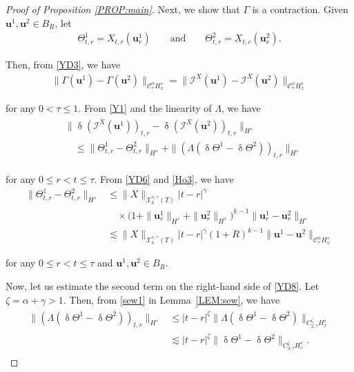 \documentclass[letterpaper, 11pt,  reqno]{amsart}
\newcommand{\1}{\hspace{0.5mm}\text{I}\hspace{0.5mm}}
\newcommand{\I}{\mathcal{I}}
\newcommand{\noi}{\noindent}
\newcommand{\CC}{\mathcal{C}}
\newcommand{\al}{\alpha}
\newcommand{\updl}{\updelta}
\newcommand{\g}{\gamma}
\newcommand{\G}{\Gamma}
\newcommand{\Ld}{\Lambda}
\newcommand{\les}{\lesssim}
\newcommand{\cX}{\mathcal{X}}
\newcommand{\uu}{\mathbf{u}}
\newcommand{\z}{\zeta}
\newcommand{\Ta}{\Theta}
\numberwithin{equation}{section}
\numberwithin{theorem}{section}
\begin{document}
\begin{proof}[Proof of Proposition \ref{PROP:main}]
Next, we show that $\G$ is a contraction. 
Given $\uu^1, \uu^2 \in B_R$, let 
\begin{align}
\Theta_{t,r}^1 = X_{t,r}(\uu^1_r)
\qquad \text{and}\qquad 
\Ta_{t,r}^2 = X_{t,r}(\uu^2_r).
\label{YD6}
\end{align}

\noi
Then, 
from \eqref{YD3}, we have 
\begin{align}
\|\G(\uu^1)- \G(\uu^2)\|_{\CC^\al_{\tau }H^s_x}
=
\|\I^X(\uu^1)- \I^X(\uu^2)\|_{\CC^\al_{\tau}H^s_x}
\label{YD7}
\end{align}


\noi
for any $0 < \tau \le 1$.
From \eqref{Y1} and the linearity of $\Ld$, we have 
\begin{align}
\begin{split}
& \|\updl(\I^X(\uu^1))_{t, r}- 
\updl(\I^X(\uu^2))_{t, r}\|_{H^s}\\
& \quad \le
\|\Theta^1_{t,r} - \Ta^2_{t,r} \|_{H^s} 
+
\|(\Lambda (\updl \Theta^1 - \updl \Ta^2))_{t,r}\|_{H^s}
\end{split}
\label{YD8}
\end{align}


\noi
for any $0 \le r < t \le \tau$.
From \eqref{YD6} and  \eqref{Ho3}, we have 
\begin{equation}
\label{YD9}
\begin{aligned}
\|\Theta^1_{t,r} - \Ta^2_{t,r} \|_{H^s} 
& \le 
 \|X\|_{\cX^{s,\g}_k(T)}|t-r|^{\g}\\
& \quad \times 
\big(1+\|\uu^1_r\|_{H^s} + \|\uu^2 _r\|_{H^s}\big)^{k-1}
\|\uu^1_r - \uu^2_r\|_{H^s}
\\
& \les 
\|X\|_{\cX^{s,\g}_k(T)}|t-r|^{\g}
(1+R)^{k-1}
\|\uu^1 - \uu^2\|_{\CC^\al_\tau H^s_x}
\end{aligned}
\end{equation}

\noi
for any $0 \le r < t \le \tau$
and $\uu^1, \uu^2 \in B_R$.



Now, let us estimate the second term on the right-hand side
of \eqref{YD8}.
Let  $\z = \al + \g>1$.
Then, from \eqref{sew1} in  Lemma~\ref{LEM:sew}, we have 
\begin{align}
\label{YD10}
\begin{split}
\|(\Lambda (\updl \Theta^1 - \updl \Ta^2))_{t,r}\|_{H^s}
& \le 
|t-r|^{\z}
\|\Lambda (\updl \Theta^1 - \updl \Ta^2)\|_{C^\z_{2,\tau} H^s_x}\\
& \les
|t-r|^{\z}
\| \updl \Theta^1 - \updl \Ta^2\|_{C^\z_{3,\tau} H^s_x}.
\end{split}
\end{align}






\end{proof}
\end{document}
